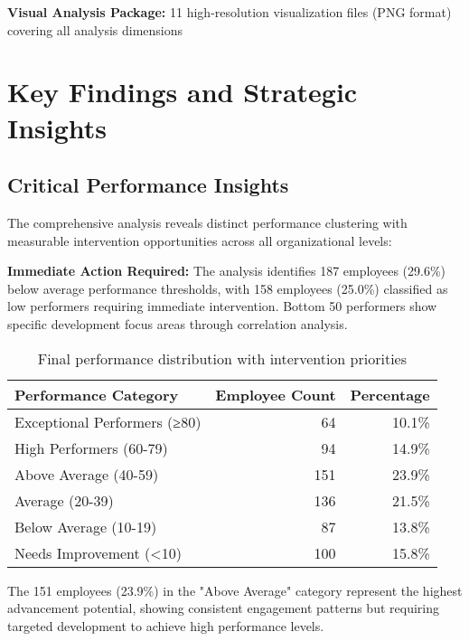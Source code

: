\documentclass[12pt,a4paper]{article}
\begin{document}
\begin{resourcebox}
\textbf{Visual Analysis Package:} 11 high-resolution visualization files (PNG format) covering all analysis dimensions
\end{resourcebox}

\section{Key Findings and Strategic Insights}

\subsection{Critical Performance Insights}

The comprehensive analysis reveals distinct performance clustering with measurable intervention opportunities across all organizational levels:

\begin{warningbox}
\textbf{Immediate Action Required:} The analysis identifies 187 employees (29.6\%) below average performance thresholds, with 158 employees (25.0\%) classified as low performers requiring immediate intervention. Bottom 50 performers show specific development focus areas through correlation analysis.
\end{warningbox}

\begin{table}[H]
\centering
\begin{tabular}{@{}lrr@{}}
\toprule
\textbf{\color{primaryBlue}Performance Category} & \textbf{\color{primaryBlue}Employee Count} & \textbf{\color{primaryBlue}Percentage} \\
\midrule
Exceptional Performers (≥80) & 64 & 10.1\% \\
High Performers (60-79) & 94 & 14.9\% \\
Above Average (40-59) & 151 & 23.9\% \\
Average (20-39) & 136 & 21.5\% \\
Below Average (10-19) & 87 & 13.8\% \\
Needs Improvement (<10) & 100 & 15.8\% \\
\bottomrule
\end{tabular}
\caption{Final performance distribution with intervention priorities}
\end{table}

The 151 employees (23.9\%) in the "Above Average" category represent the highest advancement potential, showing consistent engagement patterns but requiring targeted development to achieve high performance levels.
\end{document}
